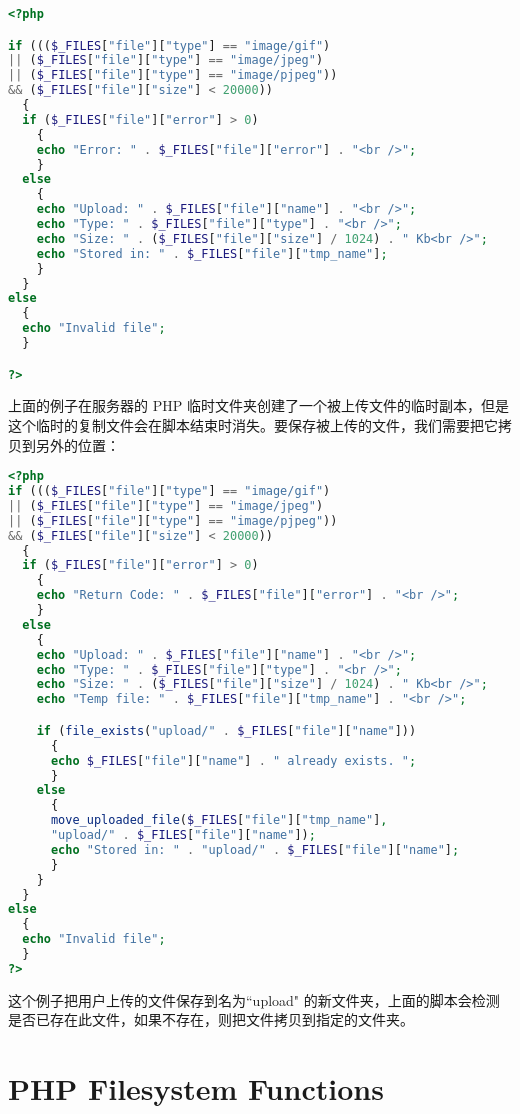 \begin{lstlisting}[language=PHP]
<?php

if ((($_FILES["file"]["type"] == "image/gif")
|| ($_FILES["file"]["type"] == "image/jpeg")
|| ($_FILES["file"]["type"] == "image/pjpeg"))
&& ($_FILES["file"]["size"] < 20000))
  {
  if ($_FILES["file"]["error"] > 0)
    {
    echo "Error: " . $_FILES["file"]["error"] . "<br />";
    }
  else
    {
    echo "Upload: " . $_FILES["file"]["name"] . "<br />";
    echo "Type: " . $_FILES["file"]["type"] . "<br />";
    echo "Size: " . ($_FILES["file"]["size"] / 1024) . " Kb<br />";
    echo "Stored in: " . $_FILES["file"]["tmp_name"];
    }
  }
else
  {
  echo "Invalid file";
  }

?>
\end{lstlisting}

上面的例子在服务器的 PHP 临时文件夹创建了一个被上传文件的临时副本，但是这个临时的复制文件会在脚本结束时消失。要保存被上传的文件，我们需要把它拷贝到另外的位置：

\begin{lstlisting}[language=PHP]
<?php
if ((($_FILES["file"]["type"] == "image/gif")
|| ($_FILES["file"]["type"] == "image/jpeg")
|| ($_FILES["file"]["type"] == "image/pjpeg"))
&& ($_FILES["file"]["size"] < 20000))
  {
  if ($_FILES["file"]["error"] > 0)
    {
    echo "Return Code: " . $_FILES["file"]["error"] . "<br />";
    }
  else
    {
    echo "Upload: " . $_FILES["file"]["name"] . "<br />";
    echo "Type: " . $_FILES["file"]["type"] . "<br />";
    echo "Size: " . ($_FILES["file"]["size"] / 1024) . " Kb<br />";
    echo "Temp file: " . $_FILES["file"]["tmp_name"] . "<br />";

    if (file_exists("upload/" . $_FILES["file"]["name"]))
      {
      echo $_FILES["file"]["name"] . " already exists. ";
      }
    else
      {
      move_uploaded_file($_FILES["file"]["tmp_name"],
      "upload/" . $_FILES["file"]["name"]);
      echo "Stored in: " . "upload/" . $_FILES["file"]["name"];
      }
    }
  }
else
  {
  echo "Invalid file";
  }
?>
\end{lstlisting}

这个例子把用户上传的文件保存到名为``upload" 的新文件夹，上面的脚本会检测是否已存在此文件，如果不存在，则把文件拷贝到指定的文件夹。



\section{PHP Filesystem Functions}


